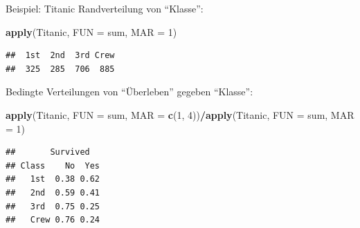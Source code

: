 \documentclass[
  10pt,
  ignorenonframetext,
]{beamer}
\newenvironment{Shaded}{\begin{snugshade}}{\end{snugshade}}
\newcommand{\AttributeTok}[1]{\textcolor[rgb]{0.13,0.29,0.53}{#1}}
\newcommand{\DecValTok}[1]{\textcolor[rgb]{0.00,0.00,0.81}{#1}}
\newcommand{\FunctionTok}[1]{\textcolor[rgb]{0.13,0.29,0.53}{\textbf{#1}}}
\newcommand{\NormalTok}[1]{#1}
\newcommand{\SpecialCharTok}[1]{\textcolor[rgb]{0.81,0.36,0.00}{\textbf{#1}}}
\begin{document}
\begin{frame}[fragile]{Beispiel: Titanic}
\label{beispiel-titanic-1}
Randverteilung von ``Klasse'': \scriptsize

\begin{Shaded}
\begin{Highlighting}[]
\FunctionTok{apply}\NormalTok{(Titanic, }\AttributeTok{FUN =}\NormalTok{ sum, }\AttributeTok{MAR =} \DecValTok{1}\NormalTok{)}
\end{Highlighting}
\end{Shaded}

\begin{verbatim}
##  1st  2nd  3rd Crew 
##  325  285  706  885
\end{verbatim}

\normalsize

Bedingte Verteilungen von ``Überleben'' gegeben ``Klasse'': \scriptsize

\begin{Shaded}
\begin{Highlighting}[]
\FunctionTok{apply}\NormalTok{(Titanic, }\AttributeTok{FUN =}\NormalTok{ sum, }\AttributeTok{MAR =} \FunctionTok{c}\NormalTok{(}\DecValTok{1}\NormalTok{, }\DecValTok{4}\NormalTok{))}\SpecialCharTok{/}\FunctionTok{apply}\NormalTok{(Titanic, }\AttributeTok{FUN =}\NormalTok{ sum, }\AttributeTok{MAR =} \DecValTok{1}\NormalTok{)}
\end{Highlighting}
\end{Shaded}

\begin{verbatim}
##       Survived
## Class    No  Yes
##   1st  0.38 0.62
##   2nd  0.59 0.41
##   3rd  0.75 0.25
##   Crew 0.76 0.24
\end{verbatim}

\normalsize
\end{frame}
\end{document}
